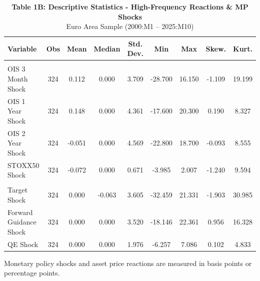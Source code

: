 \begin{table}[t]
\caption*{
{\fontsize{12}{15}\selectfont  \textbf{Table 1B: Descriptive Statistics - High-Frequency Reactions \& MP Shocks}\fontsize{12}{15}\selectfont } \\ 
{\fontsize{14}{17}\selectfont  Euro Area Sample (2000:M1 – 2025:M10)\fontsize{12}{15}\selectfont }
} 
\fontsize{12.0pt}{14.0pt}\selectfont
\begin{tabular*}{0.9\linewidth}{@{\extracolsep{\fill}}lcccccccc}
\toprule
Variable & Obs & Mean & Median & Std. Dev. & Min & Max & Skew. & Kurt. \\ 
\midrule\addlinespace[2.5pt]
\multicolumn{9}{>{\raggedright\arraybackslash}m{0.9\linewidth}}{\parbox{\linewidth}{High-Frequency Market Reactions (EA-MPD)}} \\[2.5pt] 
\midrule\addlinespace[2.5pt]
OIS 3 Month Shock & 324 & 0.112 & 0.000 & 3.709 & -28.700 & 16.150 & -1.109 & 19.199 \\ 
OIS 1 Year Shock & 324 & 0.148 & 0.000 & 4.361 & -17.600 & 20.300 & 0.190 & 8.327 \\ 
OIS 2 Year Shock & 324 & -0.051 & 0.000 & 4.569 & -22.800 & 18.700 & -0.093 & 8.555 \\ 
STOXX50 Shock & 324 & -0.072 & 0.000 & 0.671 & -3.985 & 2.007 & -1.240 & 9.594 \\ 
\midrule\addlinespace[2.5pt]
\multicolumn{9}{>{\raggedright\arraybackslash}m{0.9\linewidth}}{\parbox{\linewidth}{Monetary Policy Shocks (EA-MPD)}} \\[2.5pt] 
\midrule\addlinespace[2.5pt]
Target Shock & 324 & 0.000 & -0.063 & 3.605 & -32.459 & 21.331 & -1.903 & 30.985 \\ 
Forward Guidance Shock & 324 & 0.000 & 0.000 & 3.520 & -18.146 & 22.361 & 0.956 & 16.328 \\ 
QE Shock & 324 & 0.000 & 0.000 & 1.976 & -6.257 & 7.086 & 0.102 & 4.833 \\ 
\bottomrule
\end{tabular*}
\begin{minipage}{\linewidth}
\vspace{.05em}
Monetary policy shocks and asset price reactions are measured in basis points or percentage points.\\
\end{minipage}
\end{table}

